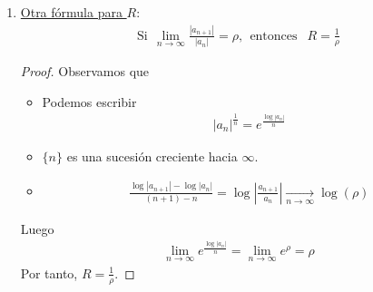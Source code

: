 \begin{obs}
\begin{enumerate}
\begin{proof}
                  Veamos que $R \leq R_0$. Supongamos que $R > 0$ (Si $R = 0$ no hay que probar nada). Sea $\rho \in (0,R)$ Entonces
                  \begin{align*}
                      \frac{1}{R} = \limsup{\sqrt[n]{|a_n|}} < \frac{1}{\rho}
                  \end{align*}
                  Entonces, existe $n_0 \in \mathbb{N}$ tal que $\sqrt[n]{|a_n|} < \frac{1}{\rho}$ para todo $n \ge n_0$, lo que nos dice que si $n \ge n_0$ entonces
                  \begin{align*}
                      |a_n| < \frac{1}{\rho^n} \Longrightarrow |a_n|\rho^n < 1 \Longrightarrow \{|a_n|\rho^n \} \text{ es acotada}
                  \end{align*}
                  Por tanto, $\rho \in A$ y $\rho \leq \sup(A) = R_0$. Como $\rho < R$ es arbitrario, concluimos que $R \leq R_0$.
              \end{proof}
        \item \underline{Otra fórmula para $R$}:
              \begin{align*}
                  \text{Si} \ \ \lim_{n \to \infty}{\frac{|a_{n+1}|}{|a_n|}} = \rho, \ \ \text{entonces } \ \ R = \frac{1}{\rho}
              \end{align*}
              \begin{proof}
                  Observamos que
                  \begin{itemize}
                      \item Podemos escribir
                            \begin{align*}
                                |a_n|^{\frac{1}{n}} = e^{\frac{\log|a_n|}{n}}
                            \end{align*}
                      \item $\{n\}$ es una sucesión creciente hacia $\infty$.
                      \item
                            \begin{align*}
                                \frac{\log|a_{n+1}| - \log|a_n|}{(n+1) -n} = \log\left| \frac{a_{n+1}}{a_n} \right| \xrightarrow[n \to \infty]{} \log(\rho)
                            \end{align*}
                  \end{itemize}
                  Luego
                  \begin{align*}
                      \lim_{n \to \infty}{e^{\frac{\log|a_n|}{n}}} = \lim_{n \to \infty}{e^{\rho}} = \rho
                  \end{align*}
                  Por tanto, $R = \frac{1}{\rho}$.
              \end{proof}
    \end{enumerate}
\end{obs}

